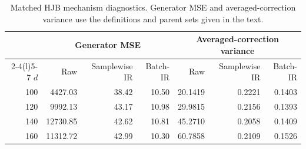 \begin{table}[htbp]
\centering\small
\caption{Matched HJB mechanism diagnostics. Generator MSE and averaged-correction variance use the definitions and parent sets given in the text.}\label{tab:extended-mechanism}
\begin{tabular}{@{}rrrrrrr@{}}
\toprule
& \multicolumn{3}{c}{Generator MSE} & \multicolumn{3}{c}{Averaged-correction variance}\\ \cmidrule(lr){2-4}\cmidrule(l){5-7} $d$ & Raw & Samplewise IR & Batch-IR & Raw & Samplewise IR & Batch-IR\\
\midrule
100 & 4427.03 & 38.42 & 10.50 & 20.1419 & 0.2221 & 0.1403\\
120 & 9992.13 & 43.17 & 10.98 & 29.9815 & 0.2156 & 0.1393\\
140 & 12730.85 & 42.62 & 10.81 & 45.2710 & 0.2058 & 0.1409\\
160 & 11312.72 & 42.99 & 10.30 & 60.7858 & 0.2109 & 0.1526\\
\bottomrule
\end{tabular}
\end{table}
